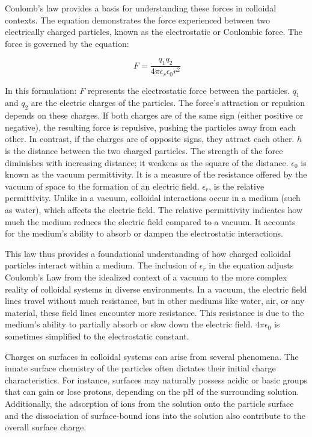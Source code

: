 Coulomb's law provides a basis for understanding these forces in colloidal contexts. The equation demonstrates the force experienced between two electrically charged particles, known as the electrostatic or Coulombic force. The force is governed by the
equation:

\begin{equation}
\
F = \frac{q_1q_2}{4 \pi \epsilon_r \epsilon_0 r^2}
\end{equation}

In this formulation:
$F$ represents the electrostatic force between the particles.
$q_1$ and $q_2$ are the electric charges of the particles. The force's attraction or repulsion depends on these charges. If both charges are of the same sign (either positive or negative), the resulting force is repulsive, pushing the particles away from each other. In contrast, if the charges are of opposite signs, they attract each other.
$h$ is the distance between the two charged particles. The strength of the force diminishes with increasing distance; it weakens as the square of the distance.
$\epsilon_0$ is known as the vacuum permittivity. It is a measure of the resistance offered by the vacuum of space to the formation of an electric field.
$\epsilon_r$, is the relative permittivity. Unlike in a vacuum, colloidal interactions occur in a medium (such as water), which affects the electric field. The relative permittivity indicates how much the medium reduces the electric field compared to a vacuum. It accounts for the medium's ability to absorb or dampen the electrostatic interactions.

This law thus provides a foundational understanding of how charged colloidal particles interact within a medium. The inclusion of $\epsilon_r$ in the equation adjusts Coulomb's Law from the idealized context of a vacuum to the more complex reality of colloidal systems in diverse environments. In a vacuum, the electric field lines travel without much resistance, but in other mediums like water, air, or any material, these field lines encounter more resistance. This resistance is due to the medium's ability to partially absorb or slow down the electric field. $4\pi \epsilon_0$ is sometimes simplified to the electrostatic constant. 

Charges on surfaces in colloidal systems can arise from several phenomena. The innate surface chemistry of the particles often dictates their initial charge characteristics. For instance, surfaces may naturally possess acidic or basic groups that can gain or lose protons, depending on the pH of the surrounding solution. Additionally, the adsorption of ions from the solution onto the particle surface and the dissociation of surface-bound ions into the solution also contribute to the overall surface charge.

